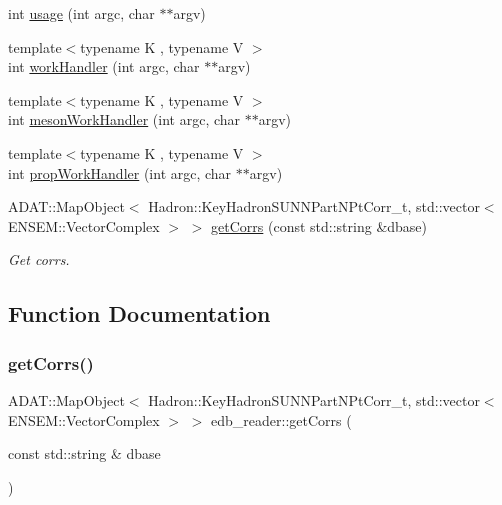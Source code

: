 \begin{DoxyCompactItemize}
int \mbox{\hyperlink{namespaceedb__reader_a39298f59ee1c604a3c52311afab377e5}{usage}} (int argc, char $\ast$$\ast$argv)
\item 
{\footnotesize template$<$typename K , typename V $>$ }\\int \mbox{\hyperlink{namespaceedb__reader_af7f03dfd858d5d80986e77d069b1ccbd}{work\+Handler}} (int argc, char $\ast$$\ast$argv)
\item 
{\footnotesize template$<$typename K , typename V $>$ }\\int \mbox{\hyperlink{namespaceedb__reader_a652a00afe7723e5e5cb678177917f3c1}{meson\+Work\+Handler}} (int argc, char $\ast$$\ast$argv)
\item 
{\footnotesize template$<$typename K , typename V $>$ }\\int \mbox{\hyperlink{namespaceedb__reader_ad11a22f7a22c60eef4c74fc64bb779f6}{prop\+Work\+Handler}} (int argc, char $\ast$$\ast$argv)
\item 
A\+D\+A\+T\+::\+Map\+Object$<$ Hadron\+::\+Key\+Hadron\+S\+U\+N\+N\+Part\+N\+Pt\+Corr\+\_\+t, std\+::vector$<$ E\+N\+S\+E\+M\+::\+Vector\+Complex $>$ $>$ \mbox{\hyperlink{namespaceedb__reader_acda70ebf60da73d7caecba719cb087a3}{get\+Corrs}} (const std\+::string \&dbase)
\begin{DoxyCompactList}\small\item\em Get corrs. \end{DoxyCompactList}\end{DoxyCompactItemize}


\subsection{Function Documentation}
\mbox{\label{namespaceedb__reader_acda70ebf60da73d7caecba719cb087a3}} 
\subsubsection{\texorpdfstring{getCorrs()}{getCorrs()}}
{\footnotesize\ttfamily A\+D\+A\+T\+::\+Map\+Object$<$ Hadron\+::\+Key\+Hadron\+S\+U\+N\+N\+Part\+N\+Pt\+Corr\+\_\+t, std\+::vector$<$ E\+N\+S\+E\+M\+::\+Vector\+Complex $>$ $>$ edb\+\_\+reader\+::get\+Corrs (\begin{DoxyParamCaption}\item[{const std\+::string \&}]{dbase }\end{DoxyParamCaption})}



